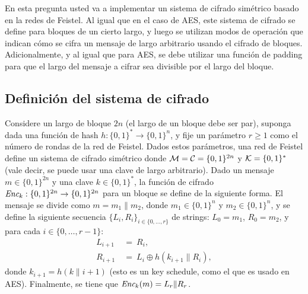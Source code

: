 


En esta pregunta usted va a implementar un sistema de cifrado simétrico basado en la redes de Feistel.
Al igual que en el caso de AES, este sistema de cifrado se define para bloques de un cierto largo, y luego se utilizan modos de operación que indican cómo se cifra un mensaje de largo arbitrario usando el cifrado de bloques. Adicionalmente, y al igual que para AES, se debe utilizar una función de padding para que el largo del mensaje a cifrar sea divisible por el largo del bloque.

\subsection*{Definición del sistema de cifrado}
Considere un largo de bloque $2n$ (el largo de un bloque debe ser par), suponga dada una función de hash $h : \{0,1\}^* \to \{0,1\}^n$, y fije un parámetro $r \geq 1$ como el número de rondas de la red de Feistel. Dados estos parámetros, una red de Feistel define un sistema de cifrado simétrico donde $\mathcal{M} = \mathcal{C} = \{0,1\}^{2n}$ y $\mathcal{K} = \{0,1\}^*$ (vale decir, se puede usar una clave de largo arbitrario). Dado un mensaje $m \in \{0,1\}^{2n}$ y una clave $k \in \{0,1\}^*$, la función de cifrado $\textit{Enc}_k : \{0,1\}^{2n} \to \{0,1\}^{2n}$ para un bloque se define de la siguiente forma. El mensaje se divide como $m = m_1 \| m_2$, donde $m_1 \in \{0,1\}^n$ y $m_2 \in \{0,1\}^n$, y se define la siguiente secuencia $\{L_i, R_i\}_{i \in \{0, \ldots, r\}}$ de strings: $L_0 = m_1$, $R_0 = m_2$, y para cada $i \in \{0, \ldots, r-1\}$:
\begin{align*}
L_{i+1} \ &= \ R_i,\\
R_{i+1} \ & = \ L_i \oplus h(k_{i+1} \| R_i),
\end{align*}
donde $k_{i+1} = h(k \| i+1)$ (esto es un key schedule, como el que es usado en AES). Finalmente, se tiene que $\textit{Enc}_k(m) = L_r \| R_r$.

